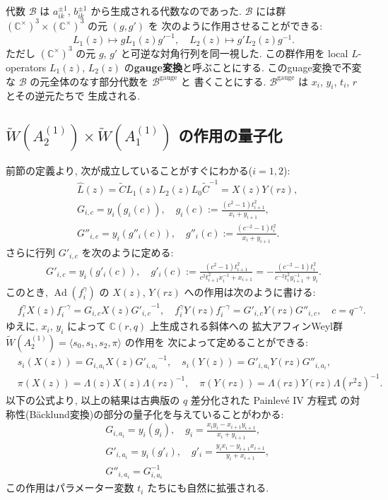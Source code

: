 \documentclass[12pt,twoside,dvipdfm]{msjproc}
\newcommand\C{{\mathbb C}} %
\theoremstyle{definition} %
\theoremstyle{definition} %
\theoremstyle{definition} %
\numberwithin{theorem}{section}
\numberwithin{equation}{section}
\numberwithin{figure}{section}
\numberwithin{table}{section}
\newcommand\bra{\langle}
\newcommand\ket{\rangle}
\newcommand\WW{\widetilde{W}}
\newcommand\B{\mathcal{B}}
\newcommand\Ad{\mathop{\mathrm{Ad}}\nolimits}
\newcommand\tC{{\widetilde{C}}}
\newcommand\hL{{\widehat{L}}}
\newcommand\gauge{{\mathrm{gauge}}}
\begin{document}
代数 $\B$ は $a_{ik}^{\pm1}$, $b_{ik}^{\pm1}$ から生成される代数なのであった.
$\B$ には群 $(\C^\times)^3\times(\C^\times)^3$ の元 $(g,g')$ を
次のように作用させることができる:
\begin{equation*}
 L_1(z)\mapsto g L_1(z) g'^{-1}, \quad
 L_2(z)\mapsto g'L_2(z) g^{-1}.
\end{equation*}
ただし $(\C^\times)^3$ の元 $g$, $g'$ と可逆な対角行列を同一視した.
この群作用を local $L$-operators $L_1(z)$, $L_2(z)$ の{\bf gauge変換}と呼ぶことにする.
このguage変換で不変な $\B$ の元全体のなす部分代数を $\B^\gauge$ と
書くことにする. $\B^\gauge$ は $x_i$, $y_i$, $t_i$, $r$ とその逆元たちで
生成される.  




\subsection{$\WW(A^{(1)}_2)\times\WW(A^{(1)}_1)$ の作用の量子化}


前節の定義より, 次が成立していることがすぐにわかる($i=1,2$):
\begin{align*}
 &
 \hL(z) = \tC L_1(z)L_2(z)L_0 \tC^{-1} = X(z)Y(rz),
 \\ &
 G_{i,c} = y_i(g_i(c)), \quad
 g_i(c) := \frac{(c^{ 2}-1)t_{i+1}^2}{x_i+y_{i+1}}, 
 \\ &
 G''_{i,c} = y_i(g''_i(c)), \quad
 g''_i(c) := \frac{(c^{-2}-1)t_i^2}{x_i+y_{i+1}}.
\end{align*}
さらに行列 $G'_{i,c}$ を次のように定める:
\begin{align*}
 G'_{i,c} = y_i(g'_i(c)), \quad
 g'_i(c)
 := \frac{(c^2-1)t_{i+1}^2}{c^2 t_{i+1}^2 x_i^{-1}+x_{i+1}}
 = - \frac{(c^{-2}-1)t_i^2}{c^{-2}t_i^2 y_{i+1}^{-1}+y_i}.
\end{align*}
このとき, $\Ad(f_i^\gamma)$ の $X(z)$, $Y(rz)$ への作用は次のように書ける:
\begin{align*}
 &
 f_i^\gamma X(z) f_i^{-\gamma} = G_{i,c} X(z) {G'_{i,c}}^{-1}, \quad
 f_i^\gamma Y(rz) f_i^{-\gamma} = G'_{i,c} Y(rz) G''_{i,c}, \quad
 c = q^{-\gamma}. 
\end{align*}
ゆえに, $x_i$, $y_i$ によって $\C(r,q)$ 上生成される斜体への
拡大アフィンWeyl群 $\WW(A^{(1)}_2)=\bra s_0,s_1,s_2,\pi\ket$ の作用を
次によって定めることができる:
\begin{align*}
 &
 s_i(X(z)) = G_{i,a_i} X(z) {G'_{i,a_i}}^{-1}, \quad
 s_i(Y(z)) = G'_{i,a_i} Y(rz) G''_{i,a_i}, \quad
 \\ &
 \pi(X(z)) = \Lambda(z)X(z)\Lambda(rz)^{-1}, \quad
 \pi(Y(rz)) = \Lambda(rz)Y(rz)\Lambda(r^2z)^{-1}.
\end{align*}
以下の公式より, 以上の結果は古典版の $q$ 差分化された Painlev\'e IV 方程式
の対称性(B\"acklund変換)の部分の量子化を与えていることがわかる:
\begin{align*}
 &
 G_{i,a_i} = y_i(g_i), \quad
 g_i = \frac{x_i y_i - x_{i+1}y_{i+1}}{x_i+y_{i+1}},
 \\ &
 G'_{i,a_i} = y_i(g'_i), \quad
 g'_i = \frac{y_i x_i - y_{i+1}x_{i+1}}{y_i+x_{i+1}},
 \\ &
 G''_{i,a_i}=G_{i,a_i}^{-1}
\end{align*}
この作用はパラメーター変数 $t_i$ たちにも自然に拡張される. 
\end{document}
